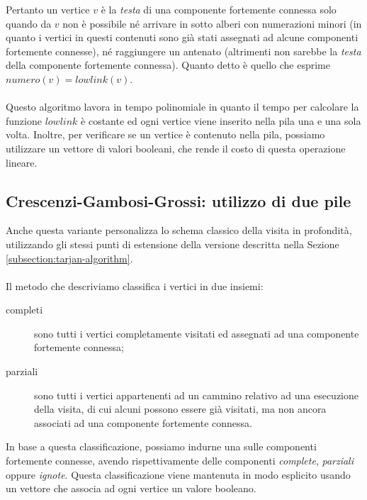 Pertanto un vertice $v$ \`e la \emph{testa} di una componente
fortemente connessa solo quando da $v$ non \`e possibile n\'e arrivare
in sotto alberi con numerazioni minori (in quanto i vertici in questi
contenuti sono gi\`a stati assegnati ad alcune componenti fortemente
connesse), n\'e raggiungere un antenato (altrimenti non sarebbe la
\emph{testa} della componente fortemente connessa). Quanto detto \`e
quello che esprime $numero(v) = lowlink(v)$.
\\\\
Questo algoritmo lavora in tempo polinomiale in quanto il tempo per
calcolare la funzione $lowlink$ \`e costante ed ogni vertice viene
inserito nella pila una e una sola volta. Inoltre, per verificare se
un vertice \`e contenuto nella pila, possiamo utilizzare un vettore di
valori booleani, che rende il costo di questa operazione lineare.

\subsection{Crescenzi-Gambosi-Grossi: utilizzo di due pile}
\label{subsection:crescenzi-gambosi-grossi}
Anche questa variante personalizza lo schema classico della visita in
profondit\`a, utilizzando gli stessi punti di estensione della
versione descritta nella Sezione \ref{subsection:tarjan-algorithm}.
\\\\
Il metodo che descriviamo classifica i vertici in due insiemi:
\begin{description}
\item[completi] sono tutti i vertici completamente visitati ed
  assegnati ad una componente fortemente connessa;
\item[parziali] sono tutti i vertici appartenenti ad un cammino
  relativo ad una esecuzione della visita, di cui alcuni possono
  essere gi\`a visitati, ma non ancora associati ad una componente
  fortemente connessa.
\end{description}
In base a questa classificazione, possiamo indurne una sulle
componenti fortemente connesse, avendo rispettivamente delle
componenti \emph{complete}, \emph{parziali} oppure
\emph{ignote}. Questa classificazione viene mantenuta in modo
esplicito usando un vettore che associa ad ogni vertice un valore
booleano.

